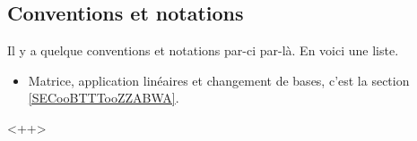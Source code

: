 









\immediate\closeout\themetoc

\subsection*{Conventions et notations}

Il y a quelque conventions et notations par-ci par-là. En voici une liste.
\begin{itemize}
    \item Matrice, application linéaires et changement de bases, c'est la section \ref{SECooBTTTooZZABWA}.
\end{itemize}
<++>

